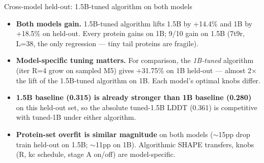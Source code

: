 \documentclass[aspectratio=169,11pt]{beamer}
\begin{document}
\begin{frame}{Cross-model held-out: 1.5B-tuned algorithm on both models}
\begin{itemize}
    \item \textbf{Both models gain.} 1.5B-tuned algorithm lifts 1.5B
          by +14.4\% and 1B by +18.5\% on held-out. Every protein
          gains on 1B; 9/10 gain on 1.5B (7t9r, L=38, the only
          regression — tiny tail proteins are fragile).
    \item \textbf{Model-specific tuning matters.} For comparison, the
          \emph{1B-tuned} algorithm (iter R=4 grow on sampled M5)
          gives +31.75\% on 1B held-out — almost 2$\times$ the lift
          of the 1.5B-tuned algorithm on 1B. Each model's optimal
          knobs differ.
    \item \textbf{1.5B baseline (0.315) is already stronger than 1B
          baseline (0.280)} on this held-out set, so the absolute
          tuned-1.5B LDDT (0.361) is competitive with tuned-1B
          under either algorithm.
    \item \textbf{Protein-set overfit is similar magnitude} on both
          models ($\sim$15pp drop train\,\textrightarrow\,held-out
          on 1.5B; $\sim$11pp on 1B). Algorithmic SHAPE transfers,
          knobs (R, kc schedule, stage A on/off) are model-specific.
  \end{itemize}
\end{frame}
\end{document}

